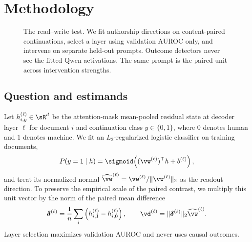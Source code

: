 \section{Methodology}
\label{sec:method}

\begin{figure}[t]
\centering
{}
\caption{The read--write test. We fit authorship directions on content-paired continuations, select a layer using validation AUROC only, and intervene on separate held-out prompts. Outcome detectors never see the fitted Qwen activations. The same prompt is the paired unit across intervention strengths.}
\label{fig:method}
\end{figure}

\subsection{Question and estimands}

Let $h_{i,y}^{(\ell)}\in\sR^d$ be the attention-mask mean-pooled residual state at decoder layer $\ell$ for document $i$ and continuation class $y\in\{0,1\}$, where 0 denotes human and 1 denotes machine. We fit an $L_2$-regularized logistic classifier on training documents,
\begin{equation}
P(y=1\mid h)=\sigmoid\!\left((\vw^{(\ell)})^\top h+b^{(\ell)}\right),
\end{equation}
and treat its normalized normal $\widehat{\vw}^{(\ell)}=\vw^{(\ell)}/\lVert\vw^{(\ell)}\rVert_2$ as the readout direction. To preserve the empirical scale of the paired contrast, we multiply this unit vector by the norm of the paired mean difference
\begin{equation}
\vdelta^{(\ell)}=\frac{1}{n}\sum_i\left(h_{i,1}^{(\ell)}-h_{i,0}^{(\ell)}\right),\qquad
\vd^{(\ell)}=\lVert\vdelta^{(\ell)}\rVert_2\widehat{\vw}^{(\ell)}.
\end{equation}
Layer selection maximizes validation AUROC and never uses causal outcomes.

